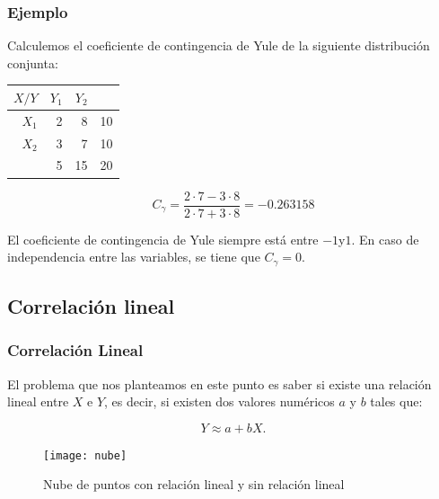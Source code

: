 \begin{frame}
\frametitle{Ejemplo}
Calculemos el coeficiente de contingencia de Yule de la siguiente  distribución conjunta:
\begin{center}
\begin{tabular}{r|rr|r}
$X/Y$ &   $Y_1$   &    $Y_2$  & \\ \hline $X_1$   &      2       &      8    & 10\\

 $X_2$   &      3        &      7    &  10 \\
\hline
        &      5       &  15     &  20
\end{tabular}
\end{center}

$$C_{\gamma} =\frac{2\cdot 7 - 3\cdot 8}{2\cdot 7 + 3\cdot 8}= -0.263158 $$

El coeficiente de contingencia de Yule siempre está entre $-1$y$1$. En caso de
independencia entre las variables, se tiene que $C_\gamma=0$.
\end{frame}

\subsection{Correlación lineal}

\begin{frame}
\frametitle{Correlación Lineal}
 El problema que nos planteamos en este punto es    saber si existe una relación lineal
entre $X$ e $Y$, es decir, si existen dos valores numéricos $a$ y $b$ tales que:

$$Y\approx a +b X.$$
\begin{center}
\begin{figure}
\label{LINEAL}
\texttt{[image: nube]}
 \caption{Nube de puntos con relación lineal y sin relación lineal}
\end{figure}
\end{center}
\end{frame}

